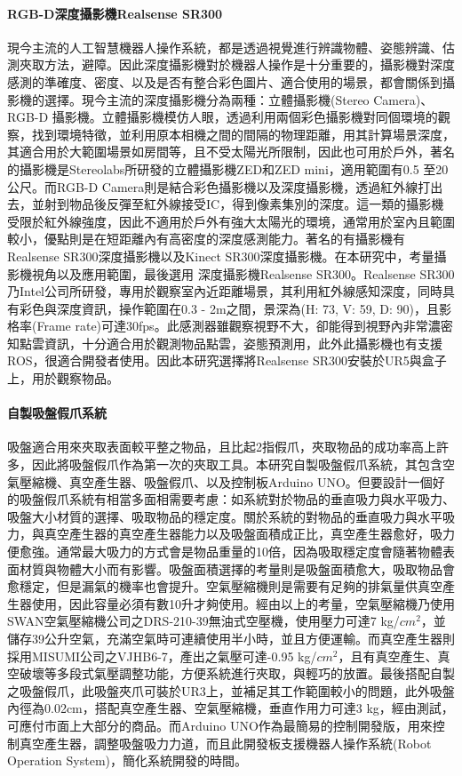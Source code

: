 \paragraph{RGB-D深度攝影機Realsense SR300}
現今主流的人工智慧機器人操作系統，都是透過視覺進行辨識物體、姿態辨識、估測夾取方法，避障。因此深度攝影機對於機器人操作是十分重要的，攝影機對深度感測的準確度、密度、以及是否有整合彩色圖片、適合使用的場景，都會關係到攝影機的選擇。現今主流的深度攝影機分為兩種：立體攝影機(Stereo Camera)、RGB-D 攝影機。立體攝影機模仿人眼，透過利用兩個彩色攝影機對同個環境的觀察，找到環境特徵，並利用原本相機之間的間隔的物理距離，用其計算場景深度，其適合用於大範圍場景如房間等，且不受太陽光所限制，因此也可用於戶外，著名的攝影機是Stereolabs所研發的立體攝影機ZED和ZED mini，適用範圍有0.5 至20公尺。而RGB-D Camera則是結合彩色攝影機以及深度攝影機，透過紅外線打出去，並射到物品後反彈至紅外線接受IC，得到像素集別的深度。這一類的攝影機受限於紅外線強度，因此不適用於戶外有強大太陽光的環境，通常用於室內且範圍較小，優點則是在短距離內有高密度的深度感測能力。著名的有攝影機有Realsense SR300深度攝影機以及Kinect SR300深度攝影機。在本研究中，考量攝影機視角以及應用範圍，最後選用 深度攝影機Realsense SR300。Realsense SR300乃Intel公司所研發，專用於觀察室內近距離場景，其利用紅外線感知深度，同時具有彩色與深度資訊，操作範圍在0.3 - 2m之間，景深為(H: 73, V: 59, D: 90)，且影格率(Frame rate)可達30fps。此感測器雖觀察視野不大，卻能得到視野內非常濃密知點雲資訊，十分適合用於觀測物品點雲，姿態預測用，此外此攝影機也有支援ROS，很適合開發者使用。因此本研究選擇將Realsense SR300安裝於UR5與盒子上，用於觀察物品。


\paragraph{自製吸盤假爪系統}
吸盤適合用來夾取表面較平整之物品，且比起2指假爪，夾取物品的成功率高上許多，因此將吸盤假爪作為第一次的夾取工具。本研究自製吸盤假爪系統，其包含空氣壓縮機、真空產生器、吸盤假爪、以及控制板Arduino UNO。但要設計一個好的吸盤假爪系統有相當多面相需要考慮：如系統對於物品的垂直吸力與水平吸力、吸盤大小材質的選擇、吸取物品的穩定度。關於系統的對物品的垂直吸力與水平吸力，與真空產生器的真空產生器能力以及吸盤面積成正比，真空產生器愈好，吸力便愈強。通常最大吸力的方式會是物品重量的10倍，因為吸取穩定度會隨著物體表面材質與物體大小而有影響。吸盤面積選擇的考量則是吸盤面積愈大，吸取物品會愈穩定，但是漏氣的機率也會提升。空氣壓縮機則是需要有足夠的排氣量供真空產生器使用，因此容量必須有數10升才夠使用。經由以上的考量，空氣壓縮機乃使用SWAN空氣壓縮機公司之DRS-210-39無油式空壓機，使用壓力可達7 kg/$cm^{2}$，並儲存39公升空氣，充滿空氣時可連續使用半小時，並且方便運輸。而真空產生器則採用MISUMI公司之VJHB6-7，產出之氣壓可達-0.95 kg/$cm^{2}$，且有真空產生、真空破壞等多段式氣壓調整功能，方便系統進行夾取，與輕巧的放置。最後搭配自製之吸盤假爪，此吸盤夾爪可裝於UR3上，並補足其工作範圍較小的問題，此外吸盤內徑為0.02cm，搭配真空產生器、空氣壓縮機，垂直作用力可達3 kg，經由測試，可應付市面上大部分的商品。而Arduino UNO作為最簡易的控制開發版，用來控制真空產生器，調整吸盤吸力力道，而且此開發板支援機器人操作系統(Robot Operation System)，簡化系統開發的時間。

